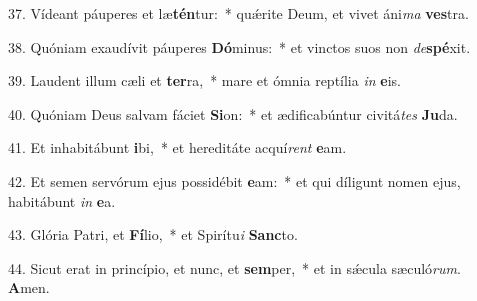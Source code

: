 37. Vídeant páuperes et læ\textbf{tén}tur:~*  quǽrite Deum, et vivet áni\textit{ma} \textbf{ves}tra.\

38. Quóniam exaudívit páuperes \textbf{Dó}minus:~*  et vinctos suos non \textit{de}\textbf{spé}xit.\

39. Laudent illum cæli et \textbf{ter}ra,~*  mare et ómnia reptília \textit{in} \textbf{e}is.\

40. Quóniam Deus salvam fáciet \textbf{Si}on:~*  et ædificabúntur civitá\textit{tes} \textbf{Ju}da.\

41. Et inhabitábunt \textbf{i}bi,~*  et hereditáte acquí\textit{rent} \textbf{e}am.\

42. Et semen servórum ejus possidébit \textbf{e}am:~*  et qui díligunt nomen ejus, habitábunt \textit{in} \textbf{e}a.\

43. Glória Patri, et \textbf{Fí}lio,~*  et Spirítu\textit{i} \textbf{Sanc}to.\

44. Sicut erat in princípio, et nunc, et \textbf{sem}per,~*  et in sǽcula sæculó\textit{rum}. \textbf{A}men.\

